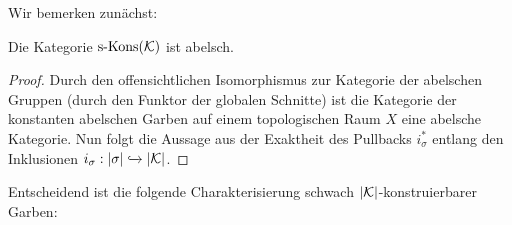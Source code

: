 Wir bemerken zunächst:

\begin{lemma}[\cite{KS}, 8.1.3] \label{skons-abelian}
  Die Kategorie $\operatorname{s-Kons}(\mathcal{K})$ ist abelsch.
\end{lemma}
\begin{proof}
  Durch den offensichtlichen Isomorphismus zur Kategorie der abelschen
  Gruppen (durch den Funktor der globalen Schnitte) ist die Kategorie
  der konstanten abelschen Garben auf einem topologischen Raum $X$
  eine abelsche Kategorie. Nun folgt die Aussage aus der Exaktheit des
  Pullbacks $i_{\sigma}^*$ entlang den Inklusionen $i_{\sigma}:
  |\sigma| \xhookrightarrow{} |\mathcal{K}|$.
\end{proof}

Entscheidend ist die folgende Charakterisierung schwach
$|\mathcal{K}|$-konstruierbarer Garben:

